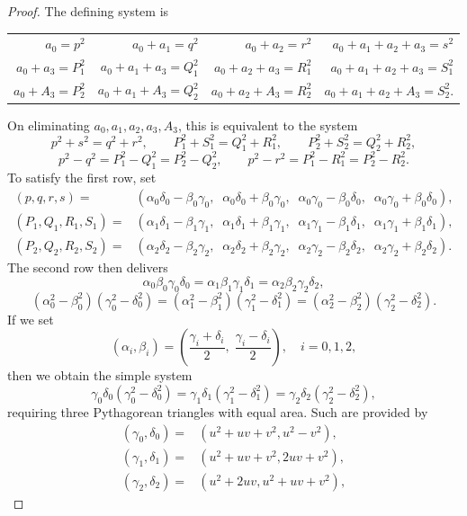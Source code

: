 \documentclass[10pt,a4paper]{amsart}
\begin{document}
\begin{proof} 
The defining system is
\begin{center}
\begin{tabular}{rrrr}
	$a_0=p^2$ & $a_0+a_1=q^2$ & $a_0+a_2=r^2$ & $a_0+a_1+a_2+a_3=s^2$ \\
	$a_0+a_3=P_1^2$ & $a_0+a_1+a_3=Q_1^2$ & $a_0+a_2+a_3=R_1^2$ & $a_0+a_1+a_2+a_3=S_1^2$ \\
	$a_0+A_3=P_2^2$ & $a_0+a_1+A_3=Q_2^2$ & $a_0+a_2+A_3=R_2^2$ & $a_0+a_1+a_2+A_3=S_2^2$.
\end{tabular}
\end{center}
On eliminating $a_0,a_1,a_2,a_3,A_3$, this is equivalent to the system
\[ p^2+s^2=q^2+r^2, \qquad P_1^2+S_1^2=Q_1^2+R_1^2, \qquad P_2^2+S_2^2=Q_2^2+R_2^2, \]
\[ p^2-q^2 = P_1^2-Q_1^2 = P_2^2-Q_2^2, \qquad p^2-r^2 = P_1^2-R_1^2 = P_2^2-R_2^2. \]
To satisfy the first row, set
\begin{align*}
	(p,q,r,s) = & (\alpha_0 \delta_0-\beta_0 \gamma_0, \;\; \alpha_0 \delta_0+\beta_0 \gamma_0, \;\; \alpha_0 \gamma_0-\beta_0 \delta_0, \;\; \alpha_0 \gamma_0+\beta_0 \delta_0), \\
	(P_1,Q_1,R_1,S_1) = & (\alpha_1 \delta_1-\beta_1 \gamma_1, \;\; \alpha_1
 \delta_1+\beta_1 \gamma_1, \;\; \alpha_1 \gamma_1-\beta_1 \delta_1, \;\; \alpha_1 \gamma_1+\beta_1 \delta_1), \\
	(P_2,Q_2,R_2,S_2) = & (\alpha_2 \delta_2-\beta_2 \gamma_2, \;\; \alpha_2
 \delta_2+\beta_2 \gamma_2, \;\; \alpha_2 \gamma_2-\beta_2 \delta_2, \;\; \alpha_2 \gamma_2+\beta_2 \delta_2).
\end{align*}
The second row then delivers
\[ \alpha_0 \beta_0 \gamma_0 \delta_0 = \alpha_1 \beta_1 \gamma_1 \delta_1 = \alpha_2 \beta_2 \gamma_2 \delta_2, \]
\[ (\alpha_0^2-\beta_0^2)(\gamma_0^2-\delta_0^2) = (\alpha_1^2-\beta_1^2)(\gamma
_1^2-\delta_1^2) = (\alpha_2^2-\beta_2^2)(\gamma_2^2-\delta_2^2). \] 
If we set
\[ (\alpha_i,\beta_i)=\left( \frac{\gamma_i+\delta_i}{2},\;\frac{\gamma_i-\delta_i}{2} \right), \quad i=0,1,2, \]
then we obtain the simple system
\[ \gamma_0 \delta_0(\gamma_0^2-\delta_0^2) = \gamma_1 \delta_1(\gamma_1^2-\delta_1^2) = \gamma_2 \delta_2(\gamma_2^2-\delta_2^2), \]
requiring three Pythagorean triangles with equal area. Such are provided by
\begin{align*}
	(\gamma_0,\delta_0) = & (u^2+u v+v^2, u^2-v^2), \\
	(\gamma_1,\delta_1) = & (u^2+u v+v^2, 2u v+v^2), \\
	(\gamma_2,\delta_2) = & (u^2+2 u v, u^2+u v+v^2),
\end{align*}

\end{proof}
\end{document}

